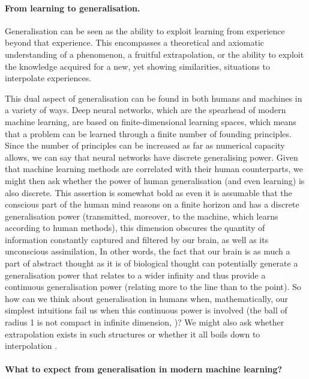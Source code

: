 \paragraph{From learning to generalisation.}

Generalisation can be seen as the ability to exploit learning from experience beyond that experience. This encompasses a theoretical and axiomatic understanding of a phenomenon, \ie a fruitful extrapolation, or the ability to exploit the knowledge acquired for a new, yet showing similarities, situations \ie to interpolate experiences. 

This dual aspect of generalisation can be found in both humans and machines in a variety of ways. Deep neural networks, which are the spearhead of modern machine learning, are based on finite-dimensional learning spaces, which means that a problem can be learned through a finite number of founding principles. Since the number of principles can be increased as far as numerical capacity allows, we can say that neural networks have discrete generalising power. Given that machine learning methods are correlated with their human counterparts, we might then ask whether the power of human generalisation (and even learning) is also discrete. This assertion is somewhat bold as even it is assumable that the conscious part of the human mind reasons on a finite horizon and has a discrete generalisation power (transmitted, moreover, to the machine, which learns according to human methods), this dimension obscures the quantity of information constantly captured and filtered by our brain, as well as its unconscious assimilation, In other words, the fact that our brain is as much a part of abstract thought as it is of biological thought can potentially generate a generalisation power that relates to a wider infinity and thus provide a continuous generalisation power (relating more to the line than to the point). So how can we think about generalisation in humans when, mathematically, our simplest intuitions fail us when this continuous power is involved (the ball of radius 1 is not compact in infinite dimension, \citealp{riesz1955lecons})? We might also ask whether extrapolation exists in such structures or whether it all boils down to interpolation \citep{hasson2020direct}.

\paragraph{What to expect from generalisation in modern machine learning?}


